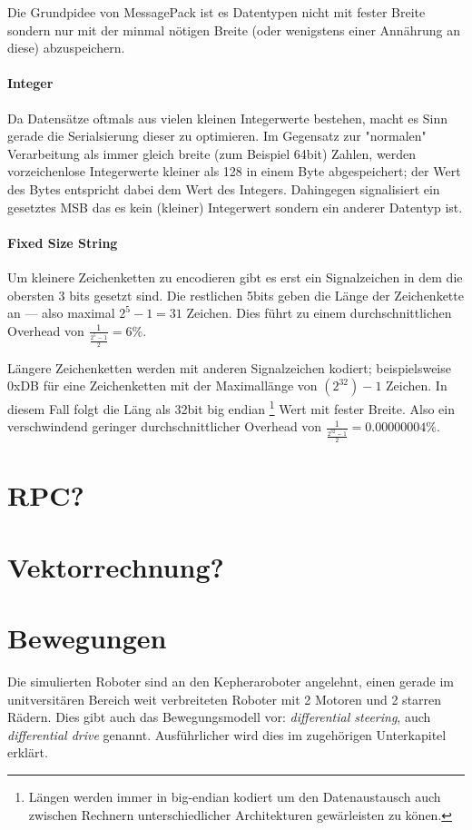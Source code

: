 \documentclass[
    12pt,
    bibliography=totoc,
    ngerman,
    enabledeprecatedfontcommands
]{scrartcl}
\begin{document}
Die Grundpidee von MessagePack ist es Datentypen nicht mit fester Breite sondern nur mit der minmal n{\"{o}}tigen Breite (oder wenigstens einer Ann{\"{a}}hrung an diese) abzuspeichern.
\paragraph{Integer} Da Datens{\"{a}}tze oftmals aus vielen kleinen Integerwerte bestehen, macht es Sinn gerade die Serialsierung dieser zu optimieren. Im Gegensatz zur "normalen" Verarbeitung als immer gleich breite (zum Beispiel 64bit) Zahlen, werden vorzeichenlose Integerwerte kleiner als 128 in einem Byte abgespeichert; der Wert des Bytes entspricht dabei dem Wert des Integers. Dahingegen signalisiert ein gesetztes MSB das es kein (kleiner) Integerwert sondern ein anderer Datentyp ist.
\paragraph{Fixed Size String} Um kleinere Zeichenketten zu encodieren gibt es erst ein Signalzeichen  in dem die obersten 3 bits gesetzt sind. Die restlichen 5bits geben die L{\"{a}}nge der Zeichenkette an --- also maximal $2^5 - 1 = 31$ Zeichen. Dies f{\"{u}}hrt zu einem durchschnittlichen Overhead von $ \frac{1}{\frac{2^5-1}{2}} = 6\% $.

L{\"{a}}ngere Zeichenketten werden mit anderen Signalzeichen kodiert; beispielsweise 0xDB f{\"{u}}r eine Zeichenketten mit der Maximall{\"{a}}nge von $(2^{32})-1$ Zeichen.
In diesem Fall folgt die L{\"{a}}ng als 32bit big endian
\footnote{L{\"{a}}ngen werden immer in big-endian kodiert um den Datenaustausch auch zwischen Rechnern unterschiedlicher Architekturen gew{\"{a}}rleisten zu k{\"{o}}nen.}
Wert mit fester Breite. Also ein verschwindend geringer durchschnittlicher Overhead von $ \frac{1}{\frac{2^{32}-1}{2}} = 0.00000004\% $.

\clearpage
\section{RPC?}

\clearpage
\section{Vektorrechnung?}

\clearpage
\section{Bewegungen}
Die simulierten Roboter sind an den Kepheraroboter angelehnt, einen gerade im unitversit{\"{a}}ren Bereich weit verbreiteten Roboter mit 2 Motoren und 2 starren R{\"{a}}dern.
Dies gibt auch das Bewegungsmodell vor: \textit{differential steering}, auch \textit{differential drive} genannt. Ausf{\"{u}}hrlicher wird dies im zugeh{\"{o}}rigen Unterkapitel erkl{\"{a}}rt.
\end{document}
